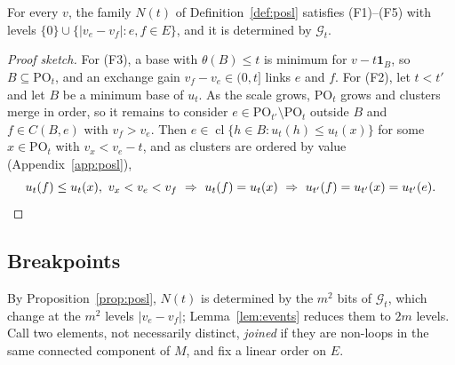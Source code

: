 \documentclass[runningheads,envcountsame]{llncs}
\newcommand{\cl}{\operatorname{cl}}
\newcommand{\PO}{\mathrm{PO}}
\begin{document}
\begin{proposition}
\label{prop:posl}
For every $v$, the family $N(t)$ of Definition~\ref{def:posl} satisfies
(F1)--(F5) with levels $\{0\}\cup\{|v_e-v_f|:e,f\in E\}$, and it is determined
by $\mathcal G_t$.
\end{proposition}

\begin{proof}[Proof sketch]
For (F3), a base with $\theta(B)\le t$ is minimum for $v-t\mathbf 1_B$, so
$B\subseteq\PO_t$, and an exchange gain $v_f-v_e\in(0,t]$ links $e$ and $f$.  For
(F2), let $t<t'$ and let $B$ be a minimum base of $u_t$.  As the scale grows,
$\PO_t$ grows and clusters merge in order, so it remains to consider
$e\in\PO_{t'}\setminus\PO_t$ outside $B$ and $f\in C(B,e)$ with $v_f>v_e$.  Then
$e\in\cl\{h\in B:u_t(h)\le u_t(x)\}$ for some $x\in\PO_t$ with $v_x<v_e-t$, and as
clusters are ordered by value (Appendix~\ref{app:posl}),
\[
  u_t(f)\le u_t(x),\ v_x<v_e<v_f\ \Rightarrow\ u_t(f)=u_t(x)\ \Rightarrow\
  u_{t'}(f)=u_{t'}(x)=u_{t'}(e).\qedhere
\]
\end{proof}

\subsection{Breakpoints}
\label{sec:events}

By Proposition~\ref{prop:posl}, $N(t)$ is determined by the $m^{2}$ bits of
$\mathcal G_t$, which change at the $m^{2}$ levels $|v_e-v_f|$;
Lemma~\ref{lem:events} reduces them to $2m$ levels.  Call two elements,
not necessarily distinct, \emph{joined} if they are non-loops in the same connected component of $M$, and
fix a linear order on $E$.
\end{document}
